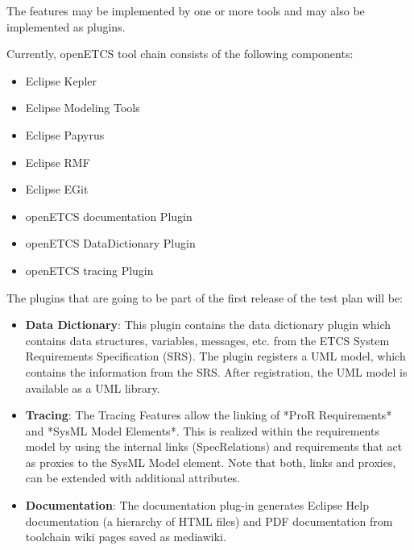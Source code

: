 The features may be implemented by one or more tools and may also be implemented as plugins.

Currently, openETCS tool chain consists of the following components:
\begin{itemize}
\item Eclipse Kepler
\item Eclipse Modeling Tools
\item Eclipse Papyrus
\item Eclipse RMF
\item Eclipse EGit
\item openETCS documentation Plugin
\item openETCS DataDictionary Plugin
\item openETCS tracing Plugin
\end{itemize}

The plugins that are going to be part of the first release of the test plan will be:
\begin{itemize}
\item \textbf{Data Dictionary}: This plugin contains the data dictionary plugin which contains data structures, variables, messages, etc. from the ETCS System Requirements Specification (SRS). The plugin registers a UML model, which contains the information from the SRS. After registration, the UML model is available as a UML library.
\item \textbf{Tracing}: The Tracing Features allow the linking of *ProR Requirements* and *SysML Model Elements*. This is realized within the requirements model by using the internal links (SpecRelations) and requirements that act as proxies to the SysML Model element. Note that both, links and proxies, can be extended with additional attributes.
\item \textbf{Documentation}: The documentation plug-in generates Eclipse Help documentation (a hierarchy of HTML files) and PDF documentation from toolchain wiki pages saved as mediawiki.
\end{itemize}

